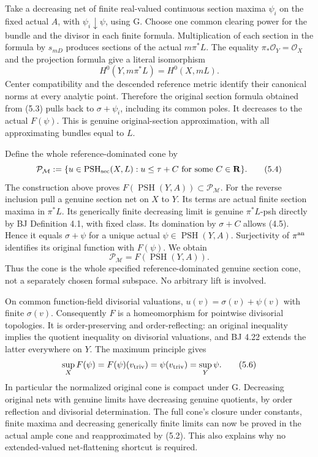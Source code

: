 \documentclass[
  10pt,
]{article}
\begin{document}
Take a decreasing net of finite real-valued continuous section maxima
\(\psi_i\) on the fixed actual \(A\), with \(\psi_i\downarrow\psi\),
using G. Choose one common clearing power for the bundle and the divisor
in each finite formula. Multiplication of each section in the formula by
\(s_{mD}\) produces sections of the actual \(m\pi^*L\). The equality
\(\pi_*\mathcal O_Y=\mathcal O_X\) and the projection formula give a
literal isomorphism \[
 H^0(Y,m\pi^*L)=H^0(X,mL).
 \tag{5.3}
\] Center compatibility and the descended reference metric identify
their canonical norms at every analytic point. Therefore the original
section formula obtained from (5.3) pulls back to \(\sigma+\psi_i\),
including its common poles. It decreases to the actual \(F(\psi)\). This
is genuine original-section approximation, with all approximating
bundles equal to \(L\).

Define the whole reference-dominated cone by \[
 \mathcal P_{\mathcal M}:=
 \{u\in\operatorname{PSH}_{\rm sec}(X,L):u\leq\tau+C
       \text{ for some }C\in\mathbf R\}.
 \tag{5.4}
\] The construction above proves
\(F(\operatorname{PSH}(Y,A))\subset\mathcal P_{\mathcal M}\). For the
reverse inclusion pull a genuine section net on \(X\) to \(Y\). Its
terms are actual finite section maxima in \(\pi^*L\). Its generically
finite decreasing limit is genuine \(\pi^*L\)-psh directly by BJ
Definition 4.1, with fixed class. Its domination by \(\sigma+C\) allows
(4.5). Hence it equals \(\sigma+\psi\) for a unique actual
\(\psi\in\operatorname{PSH}(Y,A)\). Surjectivity of \(\pi^{\rm an}\)
identifies its original function with \(F(\psi)\). We obtain \[
 \boxed{\mathcal P_{\mathcal M}=F(\operatorname{PSH}(Y,A)).}
 \tag{5.5}
\] Thus the cone is the whole specified reference-dominated genuine
section cone, not a separately chosen formal subspace. No arbitrary lift
is involved.

On common function-field divisorial valuations,
\(u(v)=\sigma(v)+\psi(v)\) with finite \(\sigma(v)\). Consequently \(F\)
is a homeomorphism for pointwise divisorial topologies. It is
order-preserving and order-reflecting: an original inequality implies
the quotient inequality on divisorial valuations, and BJ 4.22 extends
the latter everywhere on \(Y\). The maximum principle gives \[
 \sup_X F(\psi)=F(\psi)(v_{\rm triv})=\psi(v_{\rm triv})=\sup_Y\psi.
 \tag{5.6}
\] In particular the normalized original cone is compact under G.
Decreasing original nets with genuine limits have decreasing genuine
quotients, by order reflection and divisorial determination. The full
cone's closure under constants, finite maxima and decreasing generically
finite limits can now be proved in the actual ample cone and
reapproximated by (5.2). This also explains why no extended-valued
net-flattening shortcut is required.
\end{document}
